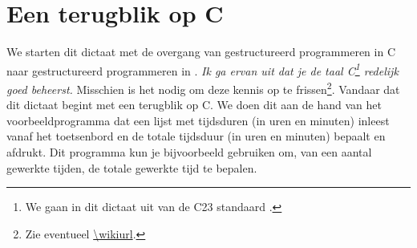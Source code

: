 \section*{Een terugblik op C}
\label{sec:terugblikC}
We starten dit dictaat met de overgang van gestructureerd programmeren in C naar gestructureerd programmeren in \Cpp{}.
\emph{Ik ga ervan uit dat je de taal C\footnote{%
	We gaan in dit dictaat uit van de C23 standaard \cite{ISO2023C}.%
} redelijk goed beheerst.}%
 Misschien is het nodig om deze kennis op te frissen\footnote{%
	Zie eventueel \url{\wikiurl}.
}.
Vandaar dat dit dictaat begint met een terugblik op C.
We doen dit aan de hand van het voorbeeldprogramma  dat een lijst met tijdsduren (in uren en minuten) inleest vanaf het toetsenbord en de totale tijdsduur (in uren en minuten) bepaalt en afdrukt.
Dit programma kun je bijvoorbeeld gebruiken om, van een aantal gewerkte tijden, de totale gewerkte tijd te bepalen.


